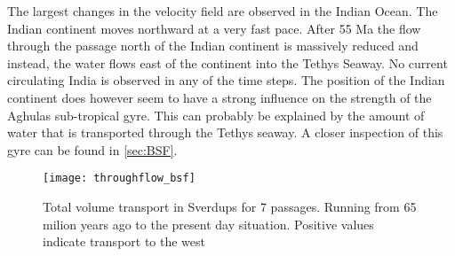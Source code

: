 The largest changes in the velocity field are observed in the Indian Ocean. The Indian continent moves northward at a very fast pace. After 55 Ma the flow through the passage north of the Indian continent is massively reduced and instead, the water flows east of the continent into the Tethys Seaway. No current circulating India is observed in any of the time steps. The position of the Indian continent does however seem to have a strong influence on the strength of the Aghulas sub-tropical gyre. This can probably be explained by the amount of water that is transported through the Tethys seaway. A closer inspection of this gyre can be found in \cref{sec:BSF}.

\begin{figure}[H]
	\texttt{[image: throughflow\_bsf]}
	\caption{Total volume transport in Sverdups for 7 passages. Running from 65 milion years ago to the present day situation. Positive values indicate transport to the west}
	\label{fig:throughflow}
\end{figure}
